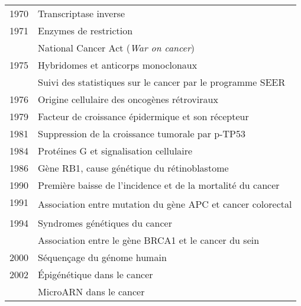 \begin{table}
\begin{center}
\begin{tabular}{cl}
						1970          & Transcriptase inverse                                                                   \\
						1971          & Enzymes de restriction                                                                  \\
													& National Cancer Act (\emph{War on cancer})                                              \\
						1975          & Hybridomes et anticorps monoclonaux                                                     \\
													& Suivi des statistiques sur le cancer par le programme \acs{SEER}                        \\
						1976          & Origine cellulaire des oncogènes rétroviraux                                            \\
						1979          & Facteur de croissance épidermique et son récepteur                                      \\
						1981          & Suppression de la croissance tumorale par \acs{p-TP53}                                  \\
						1984          & Protéines G et signalisation cellulaire                                                 \\
						1986          & Gène \acs{RB1}, cause génétique du rétinoblastome                                       \\
						1990          & Première baisse de l'incidence et de la mortalité du cancer                             \\
						1991          & \multirow{2}{6.5cm}{Association entre mutation du gène \acs{APC} et cancer colorectal}  \\
						& \\
						1994          & Syndromes génétiques du cancer                                                          \\
													& Association entre le gène \acs{BRCA1} et le cancer du sein\index{cancer!cancer du sein} \\
						2000          & Séquençage du génome humain                                                             \\
						2002          & Épigénétique dans le cancer                                                             \\
													& MicroARN dans le cancer                                                                 \\

\end{tabular}
\end{center}
\end{table}
